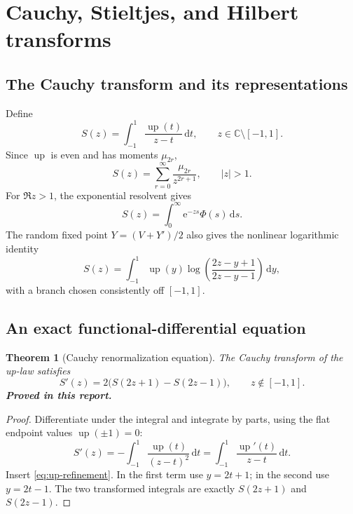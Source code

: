 \documentclass[11pt,oneside]{article}
\numberwithin{equation}{section}
\newtheorem{theorem}{Theorem}[section]
\theoremstyle{definition}
\theoremstyle{remark}
\newcommand{\C}{\mathbb C}
\newcommand{\Up}{\operatorname{up}}
\newcommand{\e}{\mathrm e}
\newcommand{\dd}{\,\mathrm d}
\newcommand{\statusproved}{\textcolor{proofgreen}{\textbf{Proved in this report.}}}
\begin{document}
\section{Cauchy, Stieltjes, and Hilbert transforms}
\label{sec:cauchy}

\subsection{The Cauchy transform and its representations}

Define
\begin{equation}
 S(z)=\int_{-1}^1\frac{\Up(t)}{z-t}\dd t,
 \qquad z\in\C\setminus[-1,1].
 \label{eq:Cauchy-def}
\end{equation}
Since \(\Up\) is even and has moments \(\mu_{2r}\),
\begin{equation}
 \boxed{
 S(z)=\sum_{r=0}^{\infty}\frac{\mu_{2r}}{z^{2r+1}},
 \qquad |z|>1.}
 \label{eq:Cauchy-moment-series}
\end{equation}
For \(\Re z>1\), the exponential resolvent gives
\begin{equation}
 \boxed{
 S(z)=\int_0^\infty\e^{-zs}\Phi(s)\dd s.}
 \label{eq:Cauchy-Laplace}
\end{equation}
The random fixed point \(Y=(V+Y')/2\) also gives the nonlinear logarithmic
identity
\begin{equation}
 \boxed{
 S(z)=\int_{-1}^1\Up(y)
 \log\!\left(\frac{2z-y+1}{2z-y-1}\right)\dd y,}
 \label{eq:Cauchy-log}
\end{equation}
with a branch chosen consistently off \([-1,1]\).

\subsection{An exact functional-differential equation}

\begin{theorem}[Cauchy renormalization equation]
\label{thm:Cauchy-functional}
The Cauchy transform of the up-law satisfies
\begin{equation}
 \boxed{
 S'(z)=2\bigl(S(2z+1)-S(2z-1)\bigr),
 \qquad z\notin[-1,1].}
 \label{eq:Cauchy-functional}
\end{equation}
\statusproved
\end{theorem}

\begin{proof}
Differentiate under the integral and integrate by parts, using the flat endpoint
values \(\Up(\pm1)=0\):
\[
 S'(z)=-\int_{-1}^1\frac{\Up(t)}{(z-t)^2}\dd t
 =\int_{-1}^1\frac{\Up'(t)}{z-t}\dd t.
\]
Insert \eqref{eq:up-refinement}.  In the first term use \(y=2t+1\); in the
second use \(y=2t-1\).  The two transformed integrals are exactly
\(S(2z+1)\) and \(S(2z-1)\).
\end{proof}
\end{document}
